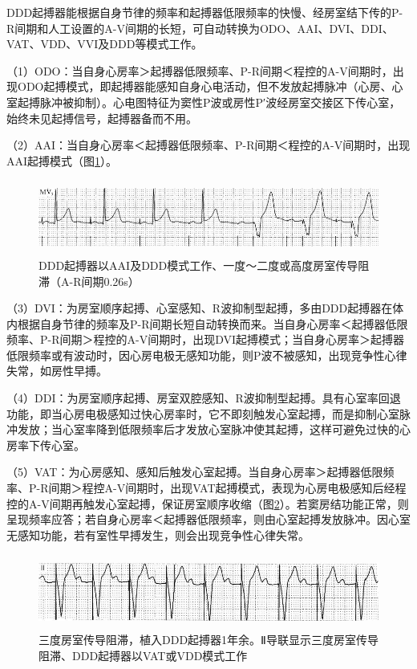DDD起搏器能根据自身节律的频率和起搏器低限频率的快慢、经房室结下传的P-R间期和人工设置的A-V间期的长短，可自动转换为ODO、AAI、DVI、DDI、VAT、VDD、VVI及DDD等模式工作。

（1）ODO：当自身心房率＞起搏器低限频率、P-R间期＜程控的A-V间期时，出现ODO起搏模式，即起搏器能感知自身心电活动，但不发放起搏脉冲（心房、心室起搏脉冲被抑制）。心电图特征为窦性P波或房性P′波经房室交接区下传心室，始终未见起搏信号，起搏器备而不用。

（2）AAI：当自身心房率＜起搏器低限频率、P-R间期＜程控的A-V间期时，出现AAI起搏模式（图\ref{fig38-22}）。

\begin{figure}[!htbp]
 \centering
 \includegraphics[width=5.58333in,height=0.95833in]{./images/Image00625.jpg}
 \captionsetup{justification=centering}
 \caption{DDD起搏器以AAI及DDD模式工作、一度～二度或高度房室传导阻滞（A-R间期0.26s）}
 \label{fig38-22}
  \end{figure} 

（3）DVI：为房室顺序起搏、心室感知、R波抑制型起搏，多由DDD起搏器在体内根据自身节律的频率及P-R间期长短自动转换而来。当自身心房率＜起搏器低限频率、P-R间期＞程控的A-V间期时，出现DVI起搏模式；当自身心房率＞起搏器低限频率或有波动时，因心房电极无感知功能，则P波不被感知，出现竞争性心律失常，如房性早搏。

（4）DDI：为房室顺序起搏、房室双腔感知、R波抑制型起搏。具有心室率回退功能，即当心房电极感知过快心房率时，它不即刻触发心室起搏，而是抑制心室脉冲发放；当心室率降到低限频率后才发放心室脉冲使其起搏，这样可避免过快的心房率下传心室。

（5）VAT：为心房感知、感知后触发心室起搏。当自身心房率＞起搏器低限频率、P-R间期＞程控A-V间期时，出现VAT起搏模式，表现为心房电极感知后经程控的A-V间期再触发心室起搏，保证房室顺序收缩（图\ref{fig38-23}）。若窦房结功能正常，则呈现频率应答；若自身心房率＜起搏器低限频率，则由心室起搏发放脉冲。因心室无感知功能，若有室性早搏发生，则会出现竞争性心律失常。

\begin{figure}[!htbp]
 \centering
 \includegraphics[width=5.58333in,height=0.95833in]{./images/Image00626.jpg}
 \captionsetup{justification=centering}
 \caption{三度房室传导阻滞，植入DDD起搏器1年余。Ⅱ导联显示三度房室传导阻滞、DDD起搏器以VAT或VDD模式工作}
 \label{fig38-23}
  \end{figure} 

